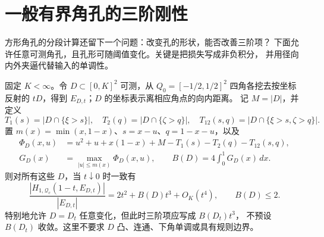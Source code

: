 \section{一般有界角孔的三阶刚性}\label{gc:section}

方形角孔的分段计算还留下一个问题：改变孔的形状，能否改善三阶项？
下面允许任意可测角孔，且孔形可随阈值变化。关键是把损失写成非负积分，
并用径向内外夹逼代替输入的单调性。

\begin{theorem}[任意有界角孔的一致展开]\label{gc:expansion}
固定 $K<\infty$。令 $D\subset[0,K]^2$ 可测，从 $Q_0=[-1/2,1/2]^2$
四角各挖去按坐标反射的 $tD$，得到 $E_{D,t}$；$D$ 的坐标表示离相应角点的向内距离。
记 $M=|D|$，并定义
\[
 T_1(s)=|D\cap\{\xi>s\}|,\quad T_2(q)=|D\cap\{\zeta>q\}|,\quad
 T_{12}(s,q)=|D\cap\{\xi>s,\zeta>q\}|.
\]
置 $m(x)=\min(x,1-x)$、$s=x-u$、$q=1-x-u$，以及
\begin{align}
 \Phi_D(x,u)&=u^2+u+x(1-x)+M-T_1(s)-T_2(q)-T_{12}(s,q),\label{gc:phi}\\
 G_D(x)&=\max_{|u|\le m(x)}\Phi_D(x,u),\qquad
 B(D)=4\int_0^1G_D(x)\,dx.\label{gc:B}
\end{align}
则对所有这些 $D$，当 $t\downarrow0$ 时一致有
\begin{equation}\label{gc:actual}
 \frac{|H_{1,\mathcal Q_c}(1-t,E_{D,t})|}{|E_{D,t}|}
 =2t^2+B(D)t^3+O_K(t^4),\qquad B(D)\le2.
\end{equation}
特别地允许 $D=D_t$ 任意变化，但此时三阶项应写成 $B(D_t)t^3$，
不预设 $B(D_t)$ 收敛。这里不要求 $D$ 凸、连通、下角单调或具有规则边界。
\end{theorem}


